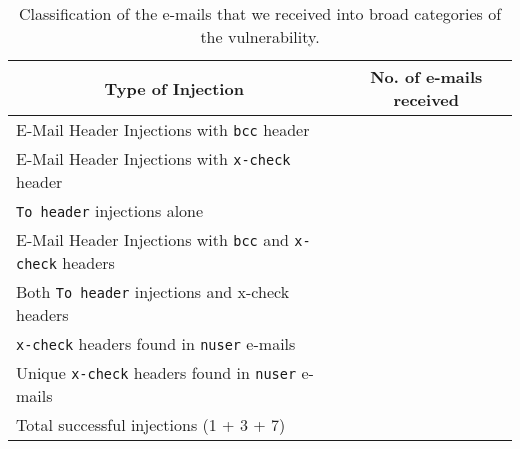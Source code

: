 \begin{table*}[tbp]
	\centering
	\normalsize
	\begin{tabular}{|l|c|}
		\hline
		\multicolumn{1}{|c|}{\textbf{Type of Injection}} &
		\multicolumn{1}{p{3cm}|}{\centering \textbf{No. of e-mails received}}\\
		\hline
		E-Mail Header Injections with \texttt{bcc} header & \ehibcc \\
		\hline
		E-Mail Header Injections with \texttt{x-check} header & \ehixcheck \\
		\hline
		\texttt{To header} injections alone & \ehito \\
		\hline
		E-Mail Header Injections with \texttt{bcc} and \texttt{x-check} headers & \ehibccxcheck \\
		\hline
		Both \texttt{To header} injections and x-check headers &
		\ehitoxcheck \\
		\hline
		\texttt{x-check} headers found in \texttt{nuser} e-mails & \ehinuserxcheck \\
		\hline
		Unique \texttt{x-check} headers found in \texttt{nuser} e-mails & \ehiuniquenuserxcheck \\
		\hline
		Total successful injections (1 + 3 + 7) & \success \\
		
		\hline
	\end{tabular}
	\caption[]{Classification of the e-mails that we received into broad categories of the vulnerability.}
	\label{tab:analysis}
\end{table*}
